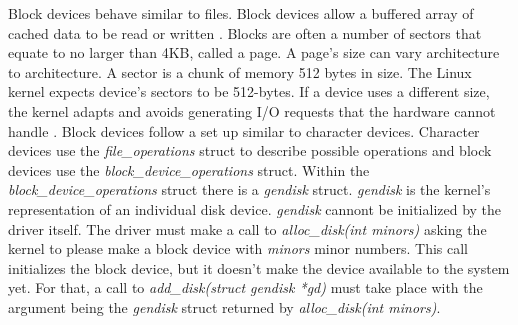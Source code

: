 \documentclass[onecolumn,draftclsnofoot, 10pt, compsoc]{IEEEtran}
\begin{document}
	Block devices behave similar to files. Block devices allow a buffered array of cached data to be read or written \cite{deviceLinuxMolly}.
	Blocks are often a number of sectors that equate to no larger than 4KB, called a page. 
	A page's size can vary architecture to architecture. 
	A sector is a chunk of memory 512 bytes in size. 
	The Linux kernel expects device's sectors to be 512-bytes.
	If a device uses a different size, the kernel adapts and avoids generating I/O requests that the hardware cannot handle \cite{implLinuxBlock}.
	Block devices follow a set up similar to character devices.
	Character devices use the \textit{file\_operations} struct to describe possible operations and block devices use the \textit{block\_device\_operations} struct.
	Within the \textit{block\_device\_operations} struct there is a \textit{gendisk} struct.
	\textit{gendisk} is the kernel's representation of an individual disk device.
	\textit{gendisk} cannont be initialized by the driver itself.
	The driver must make a call to \textit{alloc\_disk(int minors)} asking the kernel to please make a block device with \textit{minors} minor numbers.
	This call initializes the block device, but it doesn't make the device available to the system yet.
	For that, a call to \textit{add\_disk(struct gendisk *gd)} must take place with the argument being the 	\textit{gendisk} struct returned by \textit{alloc\_disk(int minors)}.
	
\end{document}
